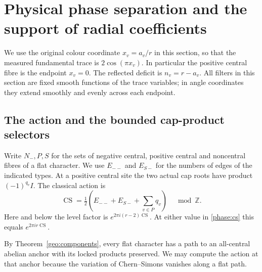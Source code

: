 \section{Physical phase separation and the support of radial coefficients}
\label{phase:section}

We use the original colour coordinate \(x_v=a_v/r\) in this section, so that the measured fundamental trace is \(2\cos(\pi x_v)\). In particular the positive central fibre is the endpoint \(x_v=0\). The reflected deficit is \(n_v=r-a_v\). All filters in this section are fixed smooth functions of the trace variables; in angle coordinates they extend smoothly and evenly across each endpoint.

\subsection{The action and the bounded cap-product selectors}
\label{phase:classical}

Write \(N_-,P,S\) for the sets of negative central, positive central and noncentral fibres of a flat character. We use \(E_{--}\) and \(E_{S-}\) for the numbers of edges of the indicated types. At a positive central site the two actual cap roots have product \((-1)^{q_v}I\). The classical action is
\begin{equation}
 \operatorname{CS}=\tfrac12\left(E_{--}+E_{S-}+\sum_{v\in P}q_v\right)
 \quad\bmod\mathbb Z .
 \label{phase:cs}
\end{equation}
Here and below the level factor is \(e^{2\pi i(r-2)\operatorname{CS}}\). At either value in \eqref{phase:cs} this equals \(e^{2\pi i r\operatorname{CS}}\).

By Theorem~\ref{geo:components}, every flat character has a path to an all-central abelian anchor with its locked products preserved. We may compute the action at that anchor because the variation of Chern--Simons vanishes along a flat path.

